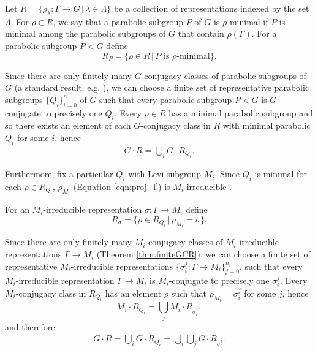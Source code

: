 Let $R = \{ \rho_\lambda : \Gamma \rightarrow G \,|\, \lambda \in \Lambda \}$ be a collection of representations indexed by the set $\Lambda$. For $\rho \in R$, we say that a parabolic subgroup $P$ of $G$ is $\rho$-minimal if $P$ is minimal among the parabolic subgroups of $G$ that contain $\rho(\Gamma)$. For a parabolic subgroup $P < G$ define
\begin{displaymath}
  R_P = \{ \rho \in R \,|\, P \textrm{ is } \rho\textrm{-minimal} \}.
\end{displaymath}

Since there are only finitely many $G$-conjugacy classes of parabolic subgroups of $G$ (a standard result, e.g. \cite[Theorem 30.1(a)]{humphreys1975linear}), we can choose a finite set of representative parabolic subgroups $\{Q_i\}_{i = 0}^n$ of $G$ such that every parabolic subgroup $P < G$ is $G$-conjugate to precisely one $Q_i$. Every $\rho \in R$ has a minimal parabolic subgroup and so there exists an element of each $G$-conjugacy class in $R$ with minimal parabolic $Q_i$ for some $i$, hence
\begin{eqnarray}
  G \cdot R = \bigcup_i G \cdot R_{Q_i}.
  \label{eqn:gr_gqi}
\end{eqnarray}

Furthermore, fix a particular $Q_i$ with Levi subgroup $M_i$. Since $Q_i$ is minimal for each $\rho \in R_{Q_i}$, $\rho_{M_i}$ (Equation \ref{eqn:proj_l}) is $M_i$-irreducible \cite[Lemma 6.2(ii)]{bate2005geometric}.

For an $M_i$-irreducible representation $\sigma : \Gamma \rightarrow M_i$ define
\begin{displaymath}
  R_{\sigma} = \{ \rho \in R_{Q_i} \,|\, \rho_{M_i} = \sigma \}.
\end{displaymath}

Since there are only finitely many $M_i$-conjugacy classes of $M_i$-irreducible representations $\Gamma \rightarrow M_i$ (Theorem \ref{thm:finiteGCR}), we can choose a finite set of representative $M_i$-irreducible representations $\{\sigma_i^j : \Gamma \rightarrow M_i \}_{j=0}^{n_i}$, such that every $M_i$-irreducible representation $\Gamma \rightarrow M_i$ is $M_i$-conjugate to precisely one $\sigma_i^j$. Every $M_i$-conjugacy class in $R_{Q_i}$ has an element $\rho$ such that $\rho_{M_i} = \sigma_i^j$ for some $j$, hence
\begin{displaymath}
  M_i \cdot R_{Q_i} = \bigcup_j M_i \cdot R_{\sigma_i^j},
\end{displaymath}
and therefore
\begin{eqnarray}
  G \cdot R = \bigcup_i G \cdot R_{Q_i} = \bigcup_i \bigcup_j G \cdot R_{\sigma_i^j}.
  \label{eqn:gr_grsigma}
\end{eqnarray}

